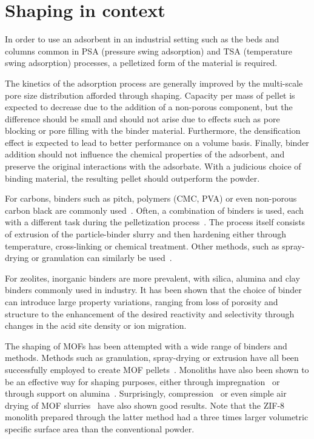 
\section{Shaping in context}

In order to use an adsorbent in an industrial setting such as the beds and
columns common in PSA (pressure swing adsorption) and TSA (temperature 
swing adsorption) processes, a pelletized form of the material
is required.\cite{akhtarStructuringAdsorbentsCatalysts2014}

The kinetics of the adsorption process are generally improved by the multi-scale
pore size distribution afforded through shaping.
Capacity per mass of pellet is expected to decrease due to the
addition of a non-porous component, but the difference should be small and should not arise
due to effects such as pore blocking or pore filling with the binder material.
Furthermore, the densification effect is expected to lead to better performance on a volume basis.
Finally, binder addition should not influence the chemical properties of the adsorbent,
and preserve the original interactions with the adsorbate.
With a judicious choice of binding material, the resulting pellet
should outperform the powder.


For carbons, binders such as pitch, polymers (CMC, PVA) or even non-porous carbon black
are commonly used~\cite{ohjiAdvancedProcessingManufacturing2008}.
Often, a combination of binders is used, each with a different task during the
pelletization process~\cite{bandoszActivatedCarbonSurfaces2006}.
The process itself consists of extrusion of the
particle-binder slurry and then hardening either through temperature, cross-linking
or chemical treatment. Other methods, such as spray-drying or granulation can similarly
be used~\cite{ruthvenPrinciplesAdsorptionAdsorption1984}.

For zeolites, inorganic binders are more prevalent, with silica, alumina and clay binders
commonly used in industry. It has been shown
\cite{whitingcuriouscasezeolite2016, MichelsEffectsBindersPerformance2014}
that the choice of binder can introduce large property variations, ranging from
loss of porosity and structure to the enhancement of the desired reactivity and selectivity
through changes in the acid site density or ion migration.

The shaping of MOFs has been attempted with a wide range of binders and methods.
Methods such as granulation, spray-drying or extrusion have all
been successfully employed to create MOF
pellets~\cite{kaskelChemistryMetalorganicFrameworks2016}.
Monoliths have also been shown to be an effective way for shaping purposes,
either through impregnation~\cite{ramos-fernandezMOFsMeetMonoliths2011} or through
support on alumina~\cite{aguadoFacileShapingImidazolatebased2010}.
Surprisingly, compression~\cite{bazer-bachiIndustrialUseMetalorganic2014} or even
simple air drying of MOF slurries~\cite{tianMechanicallyChemicallyRobust2015}
have also shown good results. Note that the ZIF-8 monolith prepared through the
latter method had a three times larger volumetric specific surface area than
the conventional powder.

